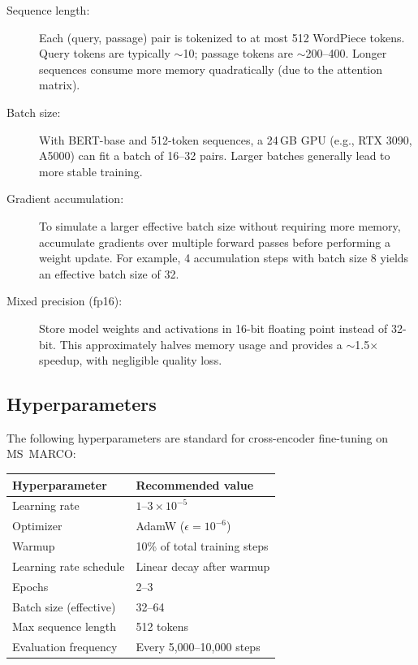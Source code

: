 \documentclass[11pt,a4paper]{article}
\theoremstyle{definition}
\theoremstyle{plain}
\begin{document}
\begin{description}
    \item[Sequence length:] Each (query, passage) pair is tokenized to at most 512 WordPiece tokens. Query tokens are typically $\sim$10; passage tokens are $\sim$200--400. Longer sequences consume more memory quadratically (due to the attention matrix).
    
    \item[Batch size:] With BERT-base and 512-token sequences, a 24\,GB GPU (e.g., RTX 3090, A5000) can fit a batch of 16--32 pairs. Larger batches generally lead to more stable training.
    
    \item[Gradient accumulation:] To simulate a larger effective batch size without requiring more memory, accumulate gradients over multiple forward passes before performing a weight update. For example, 4 accumulation steps with batch size 8 yields an effective batch size of 32.
    
    \item[Mixed precision (fp16):] Store model weights and activations in 16-bit floating point instead of 32-bit. This approximately halves memory usage and provides a $\sim$1.5$\times$ speedup, with negligible quality loss.
\end{description}

\subsection{Hyperparameters}

The following hyperparameters are standard for cross-encoder fine-tuning on MS~MARCO:

\begin{center}
\begin{tabular}{ll}
\toprule
\textbf{Hyperparameter} & \textbf{Recommended value} \\
\midrule
Learning rate & $1$--$3 \times 10^{-5}$ \\
Optimizer & AdamW ($\epsilon = 10^{-6}$) \\
Warmup & 10\% of total training steps \\
Learning rate schedule & Linear decay after warmup \\
Epochs & 2--3 \\
Batch size (effective) & 32--64 \\
Max sequence length & 512 tokens \\
Evaluation frequency & Every 5{,}000--10{,}000 steps \\
\bottomrule
\end{tabular}
\end{center}
\end{document}
